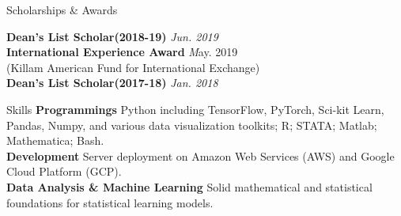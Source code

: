 \documentclass{resume} %
\begin{document}
\begin{rSection}{Scholarships \& Awards}

{\bf Dean's List Scholar(2018-19)} \hfill {\em Jun. 2019}
\\ {\bf International Experience Award} \hfill{\emph May. 2019}
\\ (Killam American Fund for International Exchange)
\\ {\bf Dean's List Scholar(2017-18)} \hfill {\em Jan. 2018}
\end{rSection}

\begin{rSection}{Skills}
\textbf{Programmings} Python including TensorFlow, PyTorch, Sci-kit Learn, Pandas, Numpy, and various data visualization toolkits; R; STATA; Matlab; Mathematica; Bash.
\\\textbf{Development} Server deployment on Amazon Web Services (AWS) and Google Cloud Platform (GCP).
\\\textbf{Data Analysis \& Machine Learning} Solid mathematical and statistical foundations for statistical learning models.
\end{rSection}
\end{document}
